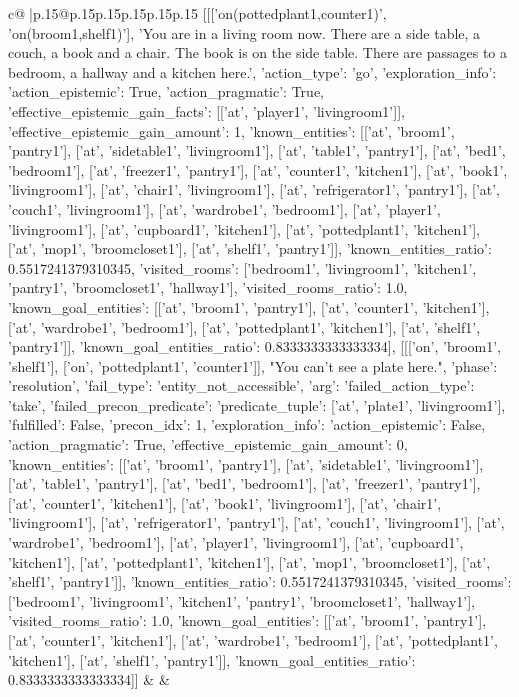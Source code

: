 \documentclass{article}
\begin{document}
{\begin{supertabular}{c@{$\;$}|p{.15\linewidth}@{}p{.15\linewidth}p{.15\linewidth}p{.15\linewidth}p{.15\linewidth}p{.15\linewidth}}
{{{	 [[['on(pottedplant1,counter1)', 'on(broom1,shelf1)'], 'You are in a living room now. There are a side table, a couch, a book and a chair. The book is on the side table. There are passages to a bedroom, a hallway and a kitchen here.', {'action_type': 'go', 'exploration_info': {'action_epistemic': True, 'action_pragmatic': True, 'effective_epistemic_gain_facts': [['at', 'player1', 'livingroom1']], 'effective_epistemic_gain_amount': 1, 'known_entities': [['at', 'broom1', 'pantry1'], ['at', 'sidetable1', 'livingroom1'], ['at', 'table1', 'pantry1'], ['at', 'bed1', 'bedroom1'], ['at', 'freezer1', 'pantry1'], ['at', 'counter1', 'kitchen1'], ['at', 'book1', 'livingroom1'], ['at', 'chair1', 'livingroom1'], ['at', 'refrigerator1', 'pantry1'], ['at', 'couch1', 'livingroom1'], ['at', 'wardrobe1', 'bedroom1'], ['at', 'player1', 'livingroom1'], ['at', 'cupboard1', 'kitchen1'], ['at', 'pottedplant1', 'kitchen1'], ['at', 'mop1', 'broomcloset1'], ['at', 'shelf1', 'pantry1']], 'known_entities_ratio': 0.5517241379310345, 'visited_rooms': ['bedroom1', 'livingroom1', 'kitchen1', 'pantry1', 'broomcloset1', 'hallway1'], 'visited_rooms_ratio': 1.0, 'known_goal_entities': [['at', 'broom1', 'pantry1'], ['at', 'counter1', 'kitchen1'], ['at', 'wardrobe1', 'bedroom1'], ['at', 'pottedplant1', 'kitchen1'], ['at', 'shelf1', 'pantry1']], 'known_goal_entities_ratio': 0.8333333333333334}}], [[['on', 'broom1', 'shelf1'], ['on', 'pottedplant1', 'counter1']], "You can't see a plate here.", {'phase': 'resolution', 'fail_type': 'entity_not_accessible', 'arg': {'failed_action_type': 'take', 'failed_precon_predicate': {'predicate_tuple': ['at', 'plate1', 'livingroom1'], 'fulfilled': False, 'precon_idx': 1}}, 'exploration_info': {'action_epistemic': False, 'action_pragmatic': True, 'effective_epistemic_gain_amount': 0, 'known_entities': [['at', 'broom1', 'pantry1'], ['at', 'sidetable1', 'livingroom1'], ['at', 'table1', 'pantry1'], ['at', 'bed1', 'bedroom1'], ['at', 'freezer1', 'pantry1'], ['at', 'counter1', 'kitchen1'], ['at', 'book1', 'livingroom1'], ['at', 'chair1', 'livingroom1'], ['at', 'refrigerator1', 'pantry1'], ['at', 'couch1', 'livingroom1'], ['at', 'wardrobe1', 'bedroom1'], ['at', 'player1', 'livingroom1'], ['at', 'cupboard1', 'kitchen1'], ['at', 'pottedplant1', 'kitchen1'], ['at', 'mop1', 'broomcloset1'], ['at', 'shelf1', 'pantry1']], 'known_entities_ratio': 0.5517241379310345, 'visited_rooms': ['bedroom1', 'livingroom1', 'kitchen1', 'pantry1', 'broomcloset1', 'hallway1'], 'visited_rooms_ratio': 1.0, 'known_goal_entities': [['at', 'broom1', 'pantry1'], ['at', 'counter1', 'kitchen1'], ['at', 'wardrobe1', 'bedroom1'], ['at', 'pottedplant1', 'kitchen1'], ['at', 'shelf1', 'pantry1']], 'known_goal_entities_ratio': 0.8333333333333334}}]] 
	  } 
	   } 
	   } 
	 & & \\ 
 


\end{supertabular}}
\end{document}

